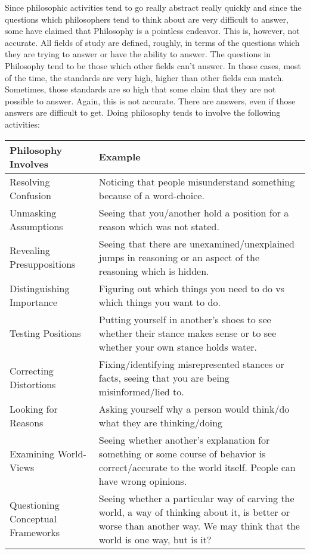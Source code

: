 Since philosophic activities tend to go really abstract really quickly and since the questions which philosophers tend to think about are very difficult to answer, some have claimed that Philosophy is a pointless endeavor. This is, however, not accurate. All fields of study are defined, roughly, in terms of the questions which they are trying to answer or have the ability to answer. The questions in Philosophy tend to be those which other fields can't answer. In those cases, most of the time, the standards are very high, higher than other fields can match. Sometimes, those standards are so high that some claim that they are not possible to answer. Again, this is not accurate. There are answers, even if those answers are difficult to get. Doing philosophy tends to involve the following activities:
\begin{tabular}{p{40mm}|p{50mm}}\hline
Philosophy Involves&Example\\\hline
Resolving Confusion &Noticing that people misunderstand something because of a word-choice.\\\hline
Unmasking Assumptions &Seeing that you/another hold a position for a reason which was not stated.\\\hline
Revealing Presuppositions &Seeing that there are unexamined/unexplained jumps in reasoning or an aspect of the reasoning which is hidden.\\\hline
Distinguishing Importance &Figuring out which things you need to do vs which things you want to do.\\\hline
Testing Positions &Putting yourself in another's shoes to see whether their stance makes sense or to see whether your own stance holds water.\\\hline
Correcting Distortions &Fixing/identifying misrepresented stances or facts, seeing that you are being misinformed/lied to.\\\hline
Looking for Reasons &Asking yourself why a person would think/do what they are thinking/doing\\\hline
Examining World-Views &Seeing whether another's explanation for something or some course of behavior is correct/accurate to the world itself. People can have wrong opinions.\\ \hline
Questioning Conceptual Frameworks &Seeing whether a particular way of carving the world, a way of thinking about it, is better or worse than another way. We may think that the world is one way, but is it?
\end{tabular}
